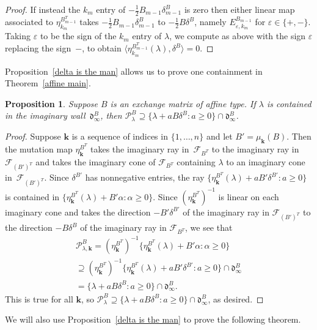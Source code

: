 \documentclass{amsart}
\newtheorem{proposition}{Proposition}[section]
\theoremstyle{definition}
\theoremstyle{remark}
\numberwithin{equation}{section}
\newcommand{\ep}{\varepsilon}
\newcommand{\set}[1]{{\lbrace #1 \rbrace}}
\newcommand{\br}[1]{{\langle #1 \rangle}}
\newcommand{\F}{{\mathcal F}}
\newcommand{\0}{{\mathbf{0}}}
\newcommand{\kk}{{\boldsymbol{k}}}
\renewcommand{\P}{\mathcal{P}}
\renewcommand{\d}{{\mathfrak d}}
\begin{document}
\begin{proof}
If instead the $k_m$ entry of $-\frac12B_{m-1}\delta^B_{m-1}$ is zero then either linear map associated to $\eta^{B^T_{m-1}}_{k_m}$ takes $-\frac12B_{m-1}\delta^B_{m-1}$ to $-\frac12B\delta^B$, namely $E_{\ep,k_m}^{B_{m-1}}$ for $\ep\in\set{+,-}$.
Taking $\ep$ to be the sign of the $k_m$ entry of $\lambda$, we compute as above with the sign $\ep$ replacing the sign~$-$, to obtain $\br{\eta^{B^T_{m-1}}_{k_m}(\lambda),\delta^B}=0$.
\end{proof}

Proposition~\ref{delta is the man} allows us to prove one containment in Theorem~\ref{affine main}.

\begin{proposition}\label{affine main partial}
Suppose $B$ is an exchange matrix of affine type.
If $\lambda$ is contained in the imaginary wall~$\d^B_\infty$, then $\P^B_\lambda\supseteq\set{\lambda+aB\delta^B:a\ge0}\cap\d^B_\infty$.  %
\end{proposition}
\begin{proof}
Suppose $\kk$ is a sequence of indices in $\set{1,\ldots,n}$ and let $B'=\mu_\kk(B)$.
Then the mutation map $\eta^{B^T}_\kk$ takes the imaginary ray in~$\F_{B^T}$ to the imaginary ray in~$\F_{(B')^T}$ and takes the imaginary cone of $\F_{B^T}$ containing $\lambda$ to an imaginary cone in~$\F_{(B')^T}$.
Since $\delta^{B'}$ has nonnegative entries, the ray $\set{\eta^{B^T}_\kk(\lambda)+aB'\delta^{B'}:a\ge0}$ is contained in $\set{\eta^{B^T}_\kk(\lambda)+B'\alpha:\alpha\ge0}$.
Since $(\eta_\kk^{B^T})^{-1}$ is linear on each imaginary cone and takes the direction $-B'\delta^{B'}$ of the imaginary ray in $\F_{(B')^T}$ to the direction $-B\delta^B$ of the imaginary ray in $\F_{B^T}$, we see that 
\begin{multline*}
\P^B_{\lambda,\kk}=(\eta_\kk^{B^T})^{-1}\set{\eta^{B^T}_\kk(\lambda)+B'\alpha:\alpha\ge0}\\
\supseteq(\eta_\kk^{B^T})^{-1}\set{\eta^{B^T}_\kk(\lambda)+aB'\delta^{B'}:a\ge0}\cap\d^B_\infty\\
=\set{\lambda+aB\delta^B:a\ge0}\cap\d^B_\infty. 
\end{multline*}
This is true for all $\kk$, so $\P^B_\lambda\supseteq\set{\lambda+aB\delta^B:a\ge0}\cap\d^B_\infty$, as desired.
\end{proof}

We will also use Proposition~\ref{delta is the man} to prove the following theorem.
\end{document}
